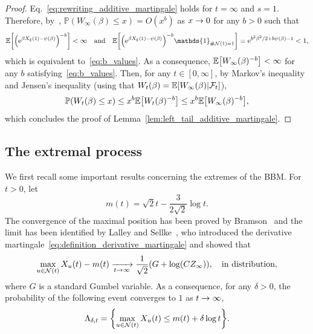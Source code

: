 \documentclass[10pt]{amsart}
\theoremstyle{definition}\newtheorem{defi}[theo]{Definition}\newtheorem{rema}[theo]{Remark}\newtheorem{exam}[theo]{Example}\newtheorem{exem}[theo]{Example}\newtheorem{nota}[theo]{Notation}
\newcommand{\e}{\mathrm{e}}
\newcommand{\E}{\mathbb{E}}
\renewcommand{\P}{\mathbb{P}}
\newcommand\1{\mathds{1}}
\newcommand{\cF}{\mathcal{F}}
\newcommand{\cN}{\mathcal{N}}
\newcommand{\Expec}[1]{\mathbb{E}\left[#1\right]}
\let\originalleft\left
\let\originalright\right
\renewcommand{\left}{\mathopen{}\mathclose\bgroup\originalleft}
\renewcommand{\right}{\aftergroup\egroup\originalright}
\renewcommand*{\to}{\mathchoice{\longrightarrow}{\rightarrow}{\rightarrow}{\rightarrow}}
\begin{document}
\begin{proof}
Eq.~\eqref{eq:rewriting_additive_martingale} holds for $t = \infty$ and $s = 1$. Therefore, by~\cite[Theorem~2.4]{Liu2001}, $\P(W_\infty(\beta) \leq x) = O(x^b)$ as $x \to 0$ for any $b>0$ such that
\begin{equation*}
\E \left[\left(\e^{\beta X_\xi(1) - \psi(\beta)} \right)^{-b} \right] < \infty \quad \text{and} \quad \E \left[\left(\e^{\beta X_\xi(1) - \psi(\beta)} \right)^{-b} \1_{\# \cN(1) = 1} \right] = \e^{b^2 \beta^2/2 + b \psi(\beta) - 1} < 1,
\end{equation*}
which is equivalent to~\eqref{eq:b_values}. As a consequence, $\Expec{W_\infty(\beta)^{-b}} < \infty$ for any $b$ satisfying~\eqref{eq:b_values}. Then, for any $t \in [0, \infty]$, by Markov's inequality and Jensen's inequality (using that $W_t(\beta) = \E \left[W_\infty(\beta) \middle| \cF_t \right]$),
\begin{equation*}
\P(W_t(\beta) \leq x) \leq x^b \Expec{W_t(\beta)^{-b}} \leq x^b \Expec{W_\infty(\beta)^{-b}},
\end{equation*}
which concludes the proof of Lemma~\ref{lem:left_tail_additive_martingale}.
\end{proof}

\subsection{The extremal process}

We first recall some important results concerning the extremes of the BBM. For $t>0$, let
\begin{equation}\label{eq:def_m(t)}
m(t) = \sqrt{2} t - \frac{3}{2 \sqrt{2}} \log t.
\end{equation}
The convergence of the maximal position has been proved by Bramson~\cite{Bramson1983} and the limit has been identified by Lalley and Sellke~\cite{LalleySellke1987}, who introduced the derivative martingale~\eqref{eq:definition_derivative_martingale} and showed that
\begin{equation}\label{eq:convergence_of_the_recentered_maximum}
\max_{u \in \cN(t)} X_u(t) - m(t) \xrightarrow[t \to \infty]{} \frac{1}{\sqrt{2}} (G + \log(CZ_\infty)), \quad \text{in distribution},
\end{equation}
where $G$ is a standard Gumbel variable. As a consequence, for any $\delta > 0$, the probability of the following event converges to $1$ as $t \to \infty$,
\begin{equation}\label{eq:bramson_estimate}
\Lambda_{\delta, t} = \left\{ \max_{u \in \cN(t)} X_u(t) \leq m(t) + \delta \log t \right\}.
\end{equation}
\end{document}
